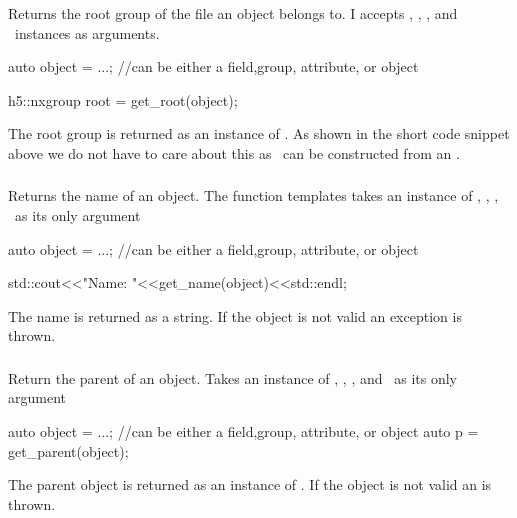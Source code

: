 \subsubsection{}

Returns the root group of the file an object belongs to. I accepts \nxobject,
\nxattribute, \nxfield, and \nxgroup\ instances as arguments. 
\begin{cppcode}
auto object = ...; //can be either a field,group, attribute, or object

h5::nxgroup root = get_root(object);
\end{cppcode}
The root group is returned as an instance of \nxobject. As shown in the short
code snippet above we do not have to care about this as \nxgroup\ can be
constructed from an \nxobject.

\subsubsection{}

Returns the name of an object. The function templates takes an instance of 
\nxobject, \nxfield, \nxattribute, \nxgroup\ as its only argument
\begin{cppcode}
auto object = ...; //can be either a field,group, attribute, or object

std::cout<<"Name: "<<get_name(object)<<std::endl;
\end{cppcode}
The name is returned as a string. If the object is not valid an
 exception is thrown.

\subsubsection{}

Return the parent of an object. Takes an instance of \nxobject, \nxfield,
\nxattribute, and \nxgroup\ as its only argument
\begin{cppcode}
auto object = ...; //can be either a field,group, attribute, or object
auto p = get_parent(object);
\end{cppcode}
The parent object is returned as an instance of \nxobject. If the object is not
valid an  is thrown.

\subsubsection{}

